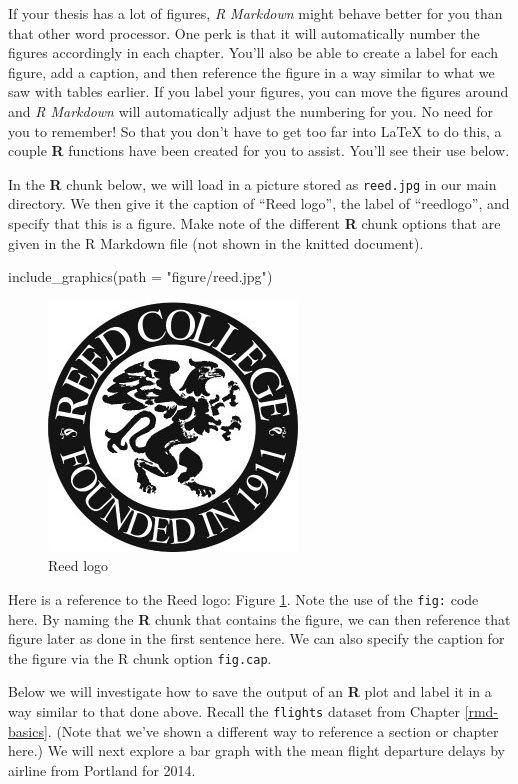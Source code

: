 \documentclass[12pt,twoside]{reedthesis}
\newenvironment{Shaded}{\begin{snugshade}}{\end{snugshade}}
\newcommand{\AttributeTok}[1]{\textcolor[rgb]{0.77,0.63,0.00}{#1}}
\newcommand{\FunctionTok}[1]{\textcolor[rgb]{0.00,0.00,0.00}{#1}}
\newcommand{\NormalTok}[1]{#1}
\newcommand{\StringTok}[1]{\textcolor[rgb]{0.31,0.60,0.02}{#1}}
\begin{document}
If your thesis has a lot of figures, \emph{R Markdown} might behave better for you than that other word processor. One perk is that it will automatically number the figures accordingly in each chapter. You'll also be able to create a label for each figure, add a caption, and then reference the figure in a way similar to what we saw with tables earlier. If you label your figures, you can move the figures around and \emph{R Markdown} will automatically adjust the numbering for you. No need for you to remember! So that you don't have to get too far into LaTeX to do this, a couple \textbf{R} functions have been created for you to assist. You'll see their use below.

In the \textbf{R} chunk below, we will load in a picture stored as \texttt{reed.jpg} in our main directory. We then give it the caption of ``Reed logo'', the label of ``reedlogo'', and specify that this is a figure. Make note of the different \textbf{R} chunk options that are given in the R Markdown file (not shown in the knitted document).
\begin{Shaded}
\begin{Highlighting}[]
\FunctionTok{include\_graphics}\NormalTok{(}\AttributeTok{path =} \StringTok{"figure/reed.jpg"}\NormalTok{)}
\end{Highlighting}
\end{Shaded}
\begin{figure}

{\centering \includegraphics[width=0.2\linewidth]{figure/reed} 

}

\caption{Reed logo}\label{fig:reedlogo}
\end{figure}
Here is a reference to the Reed logo: Figure \ref{fig:reedlogo}. Note the use of the \texttt{fig:} code here. By naming the \textbf{R} chunk that contains the figure, we can then reference that figure later as done in the first sentence here. We can also specify the caption for the figure via the R chunk option \texttt{fig.cap}.

\clearpage

Below we will investigate how to save the output of an \textbf{R} plot and label it in a way similar to that done above. Recall the \texttt{flights} dataset from Chapter \ref{rmd-basics}. (Note that we've shown a different way to reference a section or chapter here.) We will next explore a bar graph with the mean flight departure delays by airline from Portland for 2014.
\end{document}
